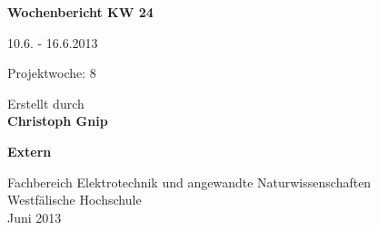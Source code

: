 
\begin{center}
{\Huge \textbf{Wochenbericht KW 24}\par}
\vspace{1cm}
{\Huge 10.6. - 16.6.2013\par}
\vspace{1cm}
{\Huge Projektwoche: 8\par}

\vspace{2cm}

\large{Erstellt durch}\\
\Large{\textbf{Christoph Gnip}}


\vspace{4cm}

\Large{\textbf{Extern}}

\vfill

{\normalsize Fachbereich Elektrotechnik und angewandte Naturwissenschaften\\
Westfälische Hochschule\\[2ex]Juni 2013}


\end{center}
\newpage